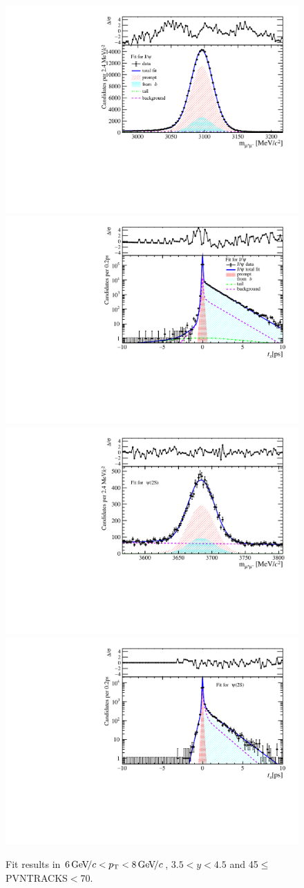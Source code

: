 \begin{figure}[H]
\begin{center}
\includegraphics[width=0.47\linewidth]{pdf/Jpsi/drawmass/n3y3pt4.pdf}
\includegraphics[width=0.47\linewidth]{pdf/Jpsi/2DFit/n3y3pt4.pdf}
\vspace*{-0.5cm}
\includegraphics[width=0.47\linewidth]{pdf/Psi2S/drawmass/n3y3pt4.pdf}
\includegraphics[width=0.47\linewidth]{pdf/Psi2S/2DFit/n3y3pt4.pdf}
\vspace*{-0.5cm}
\end{center}
\caption{Fit results in $6\text{\,Ge\kern -0.1em V\!/}c<p_{\mathrm{T}}<8\text{\,Ge\kern -0.1em V\!/}c$, $3.5<y<4.5$ and 45$\leq$PVNTRACKS$<$70.}
\label{Fitn3y3pt4}
\end{figure}
